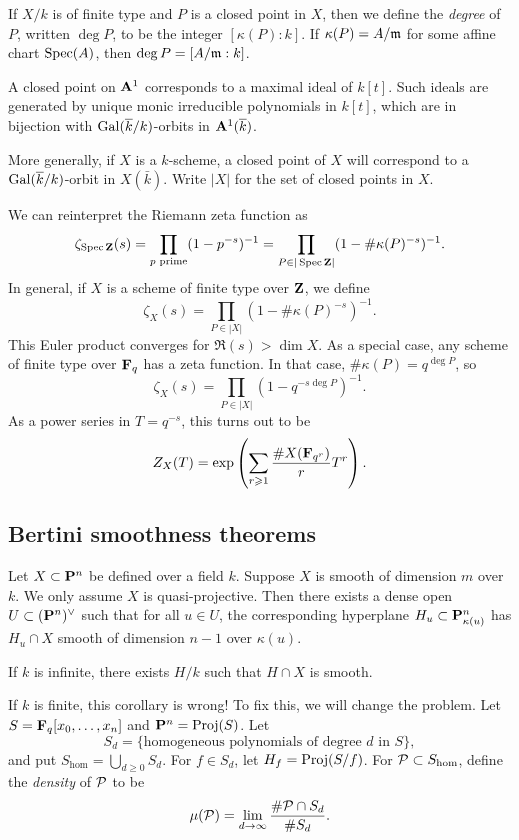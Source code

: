 If $X/k$ is of finite type and $P$ is a closed point in $X$, then we define the 
\emph{degree} of $P$, written $\deg P$, to be the integer $[\kappa(P):k]$. 
If $\kappa(P)=A/\mathfrak{m}$ for some affine chart $\operatorname{Spec}(A)$, then 
$\deg P=[A/\mathfrak{m}:k]$. 

\begin{example}
A closed point on $\mathbf{A}^1$ corresponds to a maximal ideal of $k[t]$. Such ideals 
are generated by unique monic irreducible polynomials in $k[t]$, which are 
in bijection with $\operatorname{Gal}(\overline k/k)$-orbits in $\mathbf{A}^1(\overline k)$. 
\end{example}

More generally, if $X$ is a $k$-scheme, a closed point of $X$ will correspond 
to a $\operatorname{Gal}(\overline k/k)$-orbit in $X(\bar k)$. Write $|X|$ for the set of closed 
points in $X$. 

We can reinterpret the Riemann zeta function as 
\[
  \zeta_{\operatorname{Spec}\mathbf{Z}}(s) = \prod_{p\text{ prime}} (1-p^{-s})^{-1} = \prod_{P\in |\operatorname{Spec} \mathbf{Z}|} (1-\#\kappa(P)^{-s})^{-1} .
\]
In general, if $X$ is a scheme of finite type over $\mathbf{Z}$, we define 
\[
  \zeta_X(s) = \prod_{P\in |X|} (1-\# \kappa(P)^{-s})^{-1} .
\]
This Euler product converges for $\Re(s)>\dim X$. As a special case, any scheme 
of finite type over $\mathbf{F}_q$ has a zeta function. In that case, 
$\#\kappa(P)=q^{\deg P}$, so 
\[
  \zeta_X(s) = \prod_{P\in |X|} (1-q^{-s\deg P})^{-1} .
\]
As a power series in $T=q^{-s}$, this turns out to be 
\[
  Z_X(T) = \exp\left(\sum_{r\geqslant 1} \frac{\# X(\mathbf{F}_{q^r})}{r} T^r \right) .
\]





\subsection{Bertini smoothness theorems}

Let $X\subset \mathbf{P}^n$ be defined over a field $k$. Suppose $X$ is smooth of 
dimension $m$ over $k$. We only assume $X$ is quasi-projective. Then there 
exists a dense open $U\subset (\mathbf{P}^n)^\vee$ such that for all $u\in U$, 
the corresponding hyperplane $H_u\subset \mathbf{P}_{\kappa(u)}^n$ has $H_u\cap X$ 
smooth of dimension $n-1$ over $\kappa(u)$. 

\begin{corollary}
If $k$ is infinite, there exists $H/k$ such that $H\cap X$ is smooth. 
\end{corollary}

If $k$ is finite, this corollary is wrong! To fix this, we will change the 
problem. Let $S=\mathbf{F}_q[x_0,\dots,x_n]$ and $\mathbf{P}^n=\operatorname{Proj}(S)$. Let 
\[
  S_d = \{\text{homogeneous polynomials of degree $d$ in $S$}\} ,
\]
and put $S_{\hom}=\bigcup_{d\geq 0} S_d$. For $f\in S_d$, let 
$H_f = \operatorname{Proj}(S/f)$. For $\mathcal{P}\subset S_{\hom}$, define the \emph{density} of 
$\mathcal{P}$ to be 
\[
  \mu(\mathcal{P}) = \lim_{d\to \infty} \frac{\#\mathcal{P}\cap S_d}{\# S_d} .
\]

